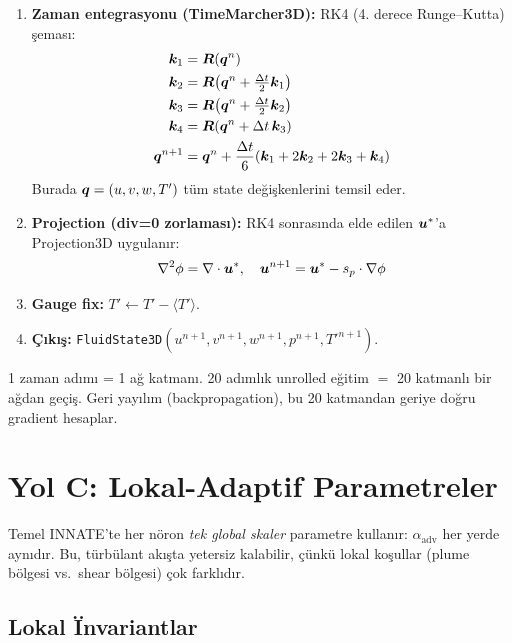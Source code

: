 \begin{enumerate}
    \item \textbf{Zaman entegrasyonu (TimeMarcher3D):}
    RK4 (4. derece Runge--Kutta) şeması:
    \begin{align}
        \bm{k}_1 &= \bm{R}(\bm{q}^n) \\
        \bm{k}_2 &= \bm{R}\!\left(\bm{q}^n + \tfrac{\Delta t}{2} \bm{k}_1\right) \\
        \bm{k}_3 &= \bm{R}\!\left(\bm{q}^n + \tfrac{\Delta t}{2} \bm{k}_2\right) \\
        \bm{k}_4 &= \bm{R}(\bm{q}^n + \Delta t \, \bm{k}_3) \\
        \bm{q}^{n+1} &= \bm{q}^n + \frac{\Delta t}{6}(\bm{k}_1 + 2\bm{k}_2 + 2\bm{k}_3 + \bm{k}_4)
    \end{align}
    Burada $\bm{q} = (u, v, w, T')$ tüm state değişkenlerini temsil eder.

    \item \textbf{Projection (div=0 zorlaması):}
    RK4 sonrasında elde edilen $\bm{u}^*$'a Projection3D uygulanır:
    \[
        \nabla^2 \phi = \nabla \cdot \bm{u}^*, \quad
        \bm{u}^{n+1} = \bm{u}^* - s_p \cdot \nabla \phi
    \]

    \item \textbf{Gauge fix:} $T' \leftarrow T' - \langle T' \rangle$.

    \item \textbf{Çıkış:} \texttt{FluidState3D}$(u^{n+1}, v^{n+1}, w^{n+1}, p^{n+1}, T'^{n+1})$.
\end{enumerate}

\begin{remark}
1 zaman adımı = 1 ağ katmanı. 20 adımlık unrolled eğitim $=$ 20 katmanlı bir ağdan geçiş. Geri yayılım (backpropagation), bu 20 katmandan geriye doğru gradient hesaplar.
\end{remark}


\section{Yol C: Lokal-Adaptif Parametreler}
\label{sec:yol_c}

Temel INNATE'te her nöron \textit{tek global skaler} parametre kullanır: $\alpha_{\text{adv}}$ her yerde aynıdır. Bu, türbülant akışta yetersiz kalabilir, çünkü lokal koşullar (plume bölgesi vs.\ shear bölgesi) çok farklıdır.

\subsection{Lokal \"{I}nvariantlar}

